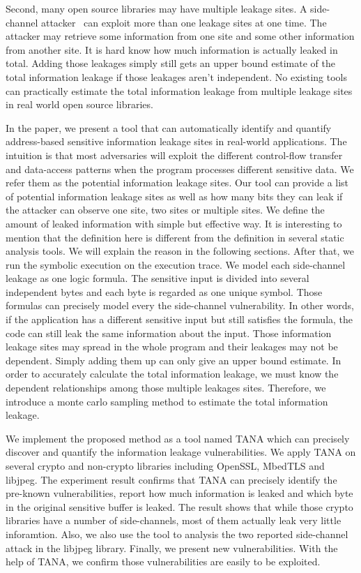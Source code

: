 Second, many open source libraries may have multiple leakage sites. 
A side-channel attacker~\cite{191010,7163052} can exploit more than one leakage sites at one time. 
The attacker may retrieve some information from one site and some other information 
from another site.
It is hard know how much information is actually leaked in total. Adding those leakages 
simply still gets an upper bound estimate of the total information leakage if those 
leakages aren’t independent. No existing tools can practically estimate the total information 
leakage from multiple leakage sites in real world open source libraries.

In the paper, we present a tool that can automatically identify and quantify address-based
sensitive information leakage sites in real-world applications. The intuition is that most
adversaries will exploit the different control-flow transfer and data-access patterns when 
the program processes different sensitive data. We refer them as the potential information
leakage sites. Our tool can provide a list of potential information leakage sites as well as how many 
bits they can leak if the attacker can observe one site, two sites or multiple sites. 
We define the amount of leaked information with simple but effective way. It is interesting to 
mention that the definition here is different from the definition in several static analysis 
tools. We will explain the reason in the following sections. After that, we run the symbolic 
execution on the execution trace. We model each side-channel leakage as one logic formula. 
The sensitive input is divided into several independent bytes and each byte is regarded as 
one unique symbol. Those formulas can precisely model every the side-channel vulnerability. 
In other words, if the application has a different sensitive input but still satisfies the formula, 
the code can still leak the same information about the input.  
Those information leakage sites may spread in the whole program 
and their leakages may not be dependent. Simply adding them up can only give an upper bound 
estimate. In order to accurately calculate the total information leakage, we must know the 
dependent relationships among those multiple leakages sites. Therefore, we introduce a 
monte carlo sampling method to estimate the total information leakage.

We implement the proposed method as a tool named TANA which can precisely discover and quantify the information
leakage vulnerabilities. We apply TANA on several crypto and non-crypto libraries including OpenSSL,
MbedTLS and libjpeg. The experiment result confirms that TANA can precisely identify the pre-known vulnerabilities,
report how much information is leaked and which byte in the original sensitive buffer is leaked. 
The result shows that while those crypto libraries have a number of side-channels, most of them actually
leak very little inforamtion. Also, we also use the tool to analysis the two reported side-channel attack 
in the libjpeg library. Finally, we present new vulnerabilities. With the help of TANA, we confirm those
vulnerabilities are easily to be exploited.

